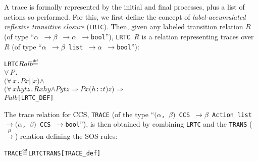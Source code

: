 \documentclass[GCNS]{yincog}
\renewcommand{\HOLinline}[1]{\mbox{\textup{\texttt{#1}}}}
\renewcommand{\HOLConst}[1]{\texttt{#1}}
\renewcommand{\HOLTyOp}[1]{\texttt{#1}}
\renewcommand{\HOLBoundVar}[1]{\ensuremath{\mathit{#1}}}
\renewcommand{\HOLFreeVar}[1]{\ensuremath{\mathit{#1}}}
\renewcommand{\HOLSymConst}[1]{#1}
\renewcommand{\HOLTokenConj}{\ensuremath{\wedge}}
\renewcommand{\HOLTokenDefEquality}{\ensuremath{\mathrel{\overset{\makebox [0pt]{\text{\tiny \textsf{def}}}}{=}}}}
\renewcommand{\HOLTokenForall}{\ensuremath{\forall \,}}
\theoremstyle{remark}
\theoremstyle{theorem}
\theoremstyle{remark}
\newcommand{\HOLTokenTransEnd}{$\rightarrow$\xspace}
\renewcommand{\HOLTokenImp}{\ensuremath{\Longrightarrow}}
\begin{document}
A trace is formally represented by the initial and final processes, plus
a list of actions so performed. For this, we first define the concept of
\emph{label-accumulated reflexive transitive closure} (\HOLinline{\HOLConst{LRTC}}).
Then, given any labeled transition relation
\HOLinline{\HOLFreeVar{R}} (of type ``\HOLinline{\ensuremath{\alpha} \HOLTokenTransEnd \ensuremath{\beta} \HOLTokenTransEnd \ensuremath{\alpha} \HOLTokenTransEnd \HOLTyOp{bool}}''),
\HOLinline{\HOLConst{LRTC} \HOLFreeVar{R}} is a relation representing traces
over \HOLinline{\HOLFreeVar{R}} (of type ``\HOLinline{\ensuremath{\alpha} \HOLTokenTransEnd \ensuremath{\beta} \HOLTyOp{list} \HOLTokenTransEnd \ensuremath{\alpha} \HOLTokenTransEnd \HOLTyOp{bool}}''):
%
\begin{alltt}
   \HOLConst{LRTC} \HOLFreeVar{R} \HOLFreeVar{a} \HOLFreeVar{l} \HOLFreeVar{b} \HOLTokenDefEquality{}
     \HOLSymConst{\HOLTokenForall{}}\HOLBoundVar{P}.
         \ensuremath{(}\HOLSymConst{\HOLTokenForall{}}\HOLBoundVar{x}. \HOLBoundVar{P} \HOLBoundVar{x} \ensuremath{[}\ensuremath{]} \HOLBoundVar{x}\ensuremath{)} \HOLSymConst{\HOLTokenConj{}}
         \ensuremath{(}\HOLSymConst{\HOLTokenForall{}}\HOLBoundVar{x} \HOLBoundVar{h} \HOLBoundVar{y} \HOLBoundVar{t} \HOLBoundVar{z}. \HOLFreeVar{R} \HOLBoundVar{x} \HOLBoundVar{h} \HOLBoundVar{y} \HOLSymConst{\HOLTokenConj{}} \HOLBoundVar{P} \HOLBoundVar{y} \HOLBoundVar{t} \HOLBoundVar{z} \HOLSymConst{\HOLTokenImp{}} \HOLBoundVar{P} \HOLBoundVar{x} \ensuremath{(}\HOLBoundVar{h}\HOLSymConst{::}\HOLBoundVar{t}\ensuremath{)} \HOLBoundVar{z}\ensuremath{)} \HOLSymConst{\HOLTokenImp{}}
         \HOLBoundVar{P} \HOLFreeVar{a} \HOLFreeVar{l} \HOLFreeVar{b}\hfill{[LRTC\_DEF]}
\end{alltt}
%
The trace relation for CCS, \HOLinline{\HOLConst{TRACE}} (of the type ``\HOLinline{\ensuremath{(}\ensuremath{\alpha}, \ensuremath{\beta}\ensuremath{)} \HOLTyOp{CCS} \HOLTokenTransEnd \ensuremath{\beta} \HOLTyOp{Action} \HOLTyOp{list} \HOLTokenTransEnd \ensuremath{(}\ensuremath{\alpha}, \ensuremath{\beta}\ensuremath{)} \HOLTyOp{CCS} \HOLTokenTransEnd \HOLTyOp{bool}}''),
is then obtained by combining \texttt{LRTC} and the \texttt{TRANS} ($
\overset{\mu}{\rightarrow}$) relation defining the SOS rules:
%
\begin{alltt}
   \HOLConst{TRACE} \HOLTokenDefEquality{} \HOLConst{LRTC} \HOLConst{TRANS}\hfill{[TRACE\_def]}
\end{alltt}
\end{document}
